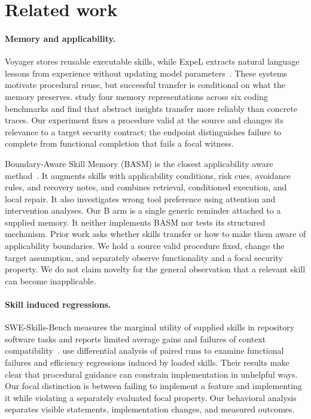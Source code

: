\section{Related work}
\paragraph{Memory and applicability.}
Voyager stores reusable executable skills, while ExpeL extracts natural language lessons from experience without updating model parameters~\citep{voyager,expel}. These systems motivate procedural reuse, but successful transfer is conditional on what the memory preserves. \citet{mtl} study four memory representations across six coding benchmarks and find that abstract insights transfer more reliably than concrete traces. Our experiment fixes a procedure valid at the source and changes its relevance to a target security contract; the endpoint distinguishes failure to complete from functional completion that fails a focal witness.

Boundary-Aware Skill Memory (BASM) is the closest applicability aware method~\citep{basm}. It augments skills with applicability conditions, risk cues, avoidance rules, and recovery notes, and combines retrieval, conditioned execution, and local repair. It also investigates wrong tool preference using attention and intervention analyses. Our B arm is a single generic reminder attached to a supplied memory. It neither implements BASM nor tests its structured mechanism. Prior work asks whether skills transfer or how to make them aware of applicability boundaries. We hold a source valid procedure fixed, change the target assumption, and separately observe functionality and a focal security property. We do not claim novelty for the general observation that a relevant skill can become inapplicable.

\paragraph{Skill induced regressions.}
SWE-Skills-Bench measures the marginal utility of supplied skills in repository software tasks and reports limited average gains and failures of context compatibility~\citep{sweskills}. \citet{harmfulskills} use differential analysis of paired runs to examine functional failures and efficiency regressions induced by loaded skills. Their results make clear that procedural guidance can constrain implementation in unhelpful ways. Our focal distinction is between failing to implement a feature and implementing it while violating a separately evaluated focal property. Our behavioral analysis separates visible statements, implementation changes, and measured outcomes.

